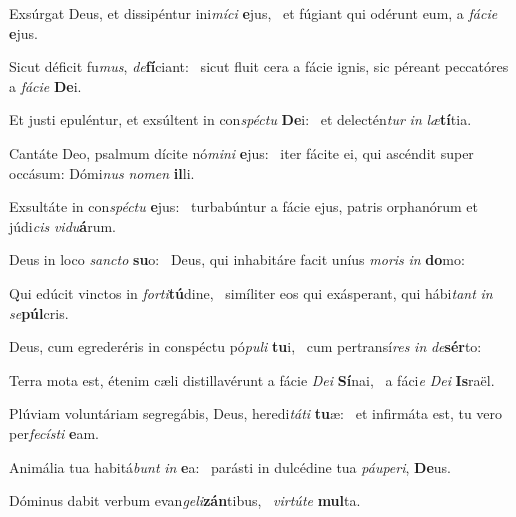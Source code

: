 \item Exsúrgat Deus, et dissipéntur ini\textit{míci} \textbf{e}jus,~\psstar{} et fúgiant qui odérunt eum, a \textit{fácie} \textbf{e}jus.

\item Sicut déficit fu\textit{mus}, \textit{de}\textbf{fí}ciant:~\psstar{} sicut fluit cera a fácie ignis, sic péreant peccatóres a \textit{fácie} \textbf{De}i.

\item Et justi epuléntur, et exsúltent in con\textit{spéctu} \textbf{De}i:~\psstar{} et delectén\textit{tur} \textit{in} \textit{læ}\textbf{tí}tia.

\item Cantáte Deo, psalmum dícite nó\textit{mini} \textbf{e}jus:~\psstar{} iter fácite ei, qui ascéndit super occásum: Dómi\textit{nus} \textit{nomen} \textbf{il}li.

\item Exsultáte in con\textit{spéctu} \textbf{e}jus:~\psstar{} turbabúntur a fácie ejus, patris orphanórum et júdi\textit{cis} \textit{vidu}\textbf{á}rum.

\item Deus in loco \textit{sancto} \textbf{su}o:~\psstar{} Deus, qui inhabitáre facit uníus \textit{moris} \textit{in} \textbf{do}mo:

\item Qui edúcit vinctos in \textit{forti}\textbf{tú}dine,~\psstar{} simíliter eos qui exásperant, qui hábi\textit{tant} \textit{in} \textit{se}\textbf{púl}cris.

\item Deus, cum egrederéris in conspéctu pó\textit{puli} \textbf{tu}i,~\psstar{} cum pertransí\textit{res} \textit{in} \textit{de}\textbf{sér}to:

\item Terra mota est, étenim cæli distillavérunt a fácie \textit{Dei} \textbf{Sí}nai,~\psstar{} a fáci\textit{e} \textit{Dei} \textbf{Is}raël.

\item Plúviam voluntáriam segregábis, Deus, heredi\textit{táti} \textbf{tu}æ:~\psstar{} et infirmáta est, tu vero per\textit{fecísti} \textbf{e}am.

\item Animália tua habitá\textit{bunt} \textit{in} \textbf{e}a:~\psstar{} parásti in dulcédine tua \textit{páuperi}, \textbf{De}us.

\item Dóminus dabit verbum evan\textit{geli}\textbf{zán}tibus,~\psstar{} \textit{virtúte} \textbf{mul}ta.

